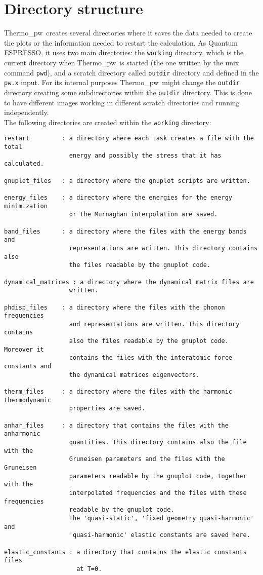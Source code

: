 \documentclass[12pt,a4paper,twoside]{report}
\def\qe{{\sc Quantum ESPRESSO}}
\def\tpw{{\sc Thermo\_pw}}
\begin{document}
\newpage
{\color{dark-blue}\chapter{Directory structure}}
\color{black}
\tpw\ creates several directories where it saves the data needed to
create the plots or the information needed to restart the calculation.  
As \qe, it uses two main directories: the \texttt{working} 
directory, which is the current directory when \tpw\ is started 
(the one written by the unix command \texttt{pwd}), and a scratch directory 
called \texttt{outdir} directory and defined in the \texttt{pw.x} input. For its
internal purposes \tpw\ might change the \texttt{outdir} directory creating
some subdirectories within the \texttt{outdir} directory. This is done to
have different images working in different scratch directories and running
independently. \\
The following directories are created within the \texttt{working} directory:
\begin{footnotesize}
\begin{verbatim}
restart         : a directory where each task creates a file with the total
                  energy and possibly the stress that it has calculated.

gnuplot_files   : a directory where the gnuplot scripts are written.

energy_files    : a directory where the energies for the energy minimization
                  or the Murnaghan interpolation are saved.

band_files      : a directory where the files with the energy bands and 
                  representations are written. This directory contains also
                  the files readable by the gnuplot code.

dynamical_matrices : a directory where the dynamical matrix files are
                  written.

phdisp_files    : a directory where the files with the phonon frequencies
                  and representations are written. This directory contains
                  also the files readable by the gnuplot code. Moreover it
                  contains the files with the interatomic force constants and
                  the dynamical matrices eigenvectors.

therm_files     : a directory where the files with the harmonic thermodynamic
                  properties are saved.

anhar_files     : a directory that contains the files with the anharmonic
                  quantities. This directory contains also the file with the
                  Gruneisen parameters and the files with the Gruneisen
                  parameters readable by the gnuplot code, together with the 
                  interpolated frequencies and the files with these frequencies
                  readable by the gnuplot code.
                  The 'quasi-static', 'fixed geometry quasi-harmonic' and
                  'quasi-harmonic' elastic constants are saved here.

elastic_constants : a directory that contains the elastic constants files
                    at T=0.
\end{verbatim}
\end{footnotesize}
\end{document}

